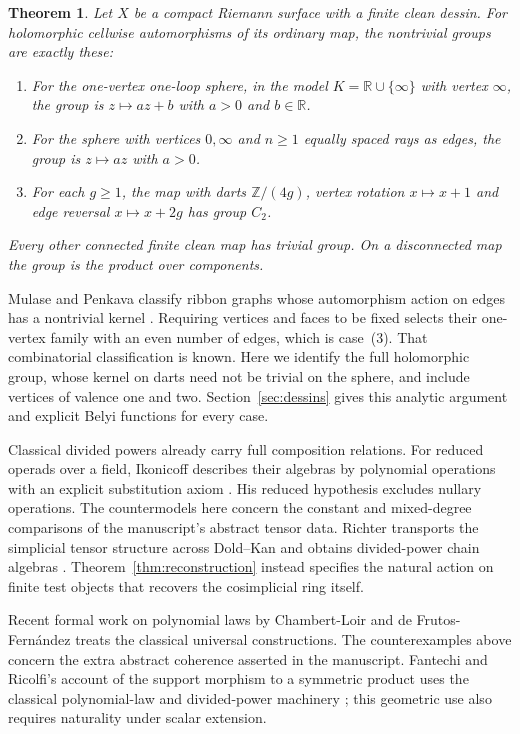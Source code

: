 \documentclass[11pt,a4paper]{article}
\newtheorem{theorem}{Theorem}[section]
\theoremstyle{definition}
\newcommand{\R}{\mathbb R}
\newcommand{\Z}{\mathbb Z}
\begin{document}
\begin{theorem}\label{thm:dessins}
Let $X$ be a compact Riemann surface with a finite clean dessin. For holomorphic cellwise automorphisms of its ordinary map, the nontrivial groups are exactly these:
\begin{enumerate}
\item For the one-vertex one-loop sphere, in the model $K=\R\cup\{\infty\}$ with vertex $\infty$, the group is $z\mapsto az+b$ with $a>0$ and $b\in\R$.
\item For the sphere with vertices $0,\infty$ and $n\ge1$ equally spaced rays as edges, the group is $z\mapsto az$ with $a>0$.
\item For each $g\ge1$, the map with darts $\Z/(4g)$, vertex rotation $x\mapsto x+1$ and edge reversal $x\mapsto x+2g$ has group $C_2$.
\end{enumerate}
Every other connected finite clean map has trivial group. On a disconnected map the group is the product over components.
\end{theorem}

Mulase and Penkava classify ribbon graphs whose automorphism action on
edges has a nontrivial kernel \cite[Definition~1.9 and classification,
pp.~880--881]{MulasePenkava}. Requiring vertices and faces to be fixed
selects their one-vertex family with an even number of edges, which
is case~(3). That combinatorial classification is known. Here we
identify the full holomorphic group, whose kernel on darts need not
be trivial on the sphere, and include vertices of valence one and two.
Section~\ref{sec:dessins} gives this analytic argument and explicit
Belyi functions for every case.



Classical divided powers already carry full composition relations.
For reduced operads over a field, Ikonicoff describes their algebras
by polynomial operations with an explicit substitution axiom
\cite[Definition~3.1.4 and Theorem~3.1.8, pp.~12--13]{Ikonicoff}.
His reduced hypothesis excludes nullary operations. The countermodels
here concern the constant and mixed-degree comparisons of the
manuscript's abstract tensor data.
Richter transports the simplicial tensor structure across Dold--Kan
and obtains divided-power chain algebras
\cite[Theorems~7.1 and~7.5, pp.~248--250]{Richter}.
Theorem~\ref{thm:reconstruction} instead specifies the natural action
on finite test objects that recovers the cosimplicial ring itself.

Recent formal work on polynomial laws by Chambert-Loir and de Frutos-Fern\'andez \cite[p.~75]{CLF} treats the classical universal constructions. The counterexamples above concern the extra abstract coherence asserted in the manuscript.
Fantechi and Ricolfi's account of the support morphism to a symmetric
product uses the classical polynomial-law and divided-power machinery
\cite[Appendix~B, pp.~27--30 of the author version]{FantechiRicolfi};
this geometric use also requires naturality under scalar extension.
\end{document}
